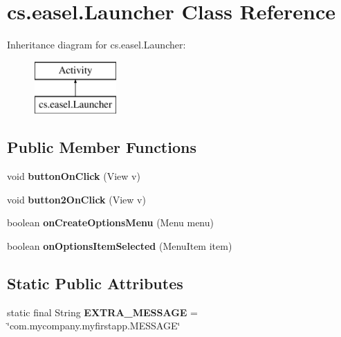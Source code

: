 \hypertarget{classcs_1_1easel_1_1_launcher}{\section{cs.\+easel.\+Launcher Class Reference}
\label{classcs_1_1easel_1_1_launcher}
}
Inheritance diagram for cs.\+easel.\+Launcher\+:\begin{figure}[H]
\begin{center}
\leavevmode
\includegraphics[height=2.000000cm]{classcs_1_1easel_1_1_launcher}
\end{center}
\end{figure}
\subsection*{Public Member Functions}
\begin{DoxyCompactItemize}
\item 
\hypertarget{classcs_1_1easel_1_1_launcher_a3a0753021e3d1510c4ebb6bb941b073c}{void {\bfseries button\+On\+Click} (View v)}\label{classcs_1_1easel_1_1_launcher_a3a0753021e3d1510c4ebb6bb941b073c}

\item 
\hypertarget{classcs_1_1easel_1_1_launcher_a60a9b20070e2aa8057de03ca8483efd0}{void {\bfseries button2\+On\+Click} (View v)}\label{classcs_1_1easel_1_1_launcher_a60a9b20070e2aa8057de03ca8483efd0}

\item 
\hypertarget{classcs_1_1easel_1_1_launcher_abad04c8d6b8aa20e931abbefe4031a09}{boolean {\bfseries on\+Create\+Options\+Menu} (Menu menu)}\label{classcs_1_1easel_1_1_launcher_abad04c8d6b8aa20e931abbefe4031a09}

\item 
\hypertarget{classcs_1_1easel_1_1_launcher_a236c7804113abde51fcef61cec2e82e7}{boolean {\bfseries on\+Options\+Item\+Selected} (Menu\+Item item)}\label{classcs_1_1easel_1_1_launcher_a236c7804113abde51fcef61cec2e82e7}

\end{DoxyCompactItemize}
\subsection*{Static Public Attributes}
\begin{DoxyCompactItemize}
\item 
\hypertarget{classcs_1_1easel_1_1_launcher_aa6e4b63807c96d9635e5677ed4c026d5}{static final String {\bfseries E\+X\+T\+R\+A\+\_\+\+M\+E\+S\+S\+A\+G\+E} = \char`\"{}com.\+mycompany.\+myfirstapp.\+M\+E\+S\+S\+A\+G\+E\char`\"{}}\label{classcs_1_1easel_1_1_launcher_aa6e4b63807c96d9635e5677ed4c026d5}

\end{DoxyCompactItemize}

